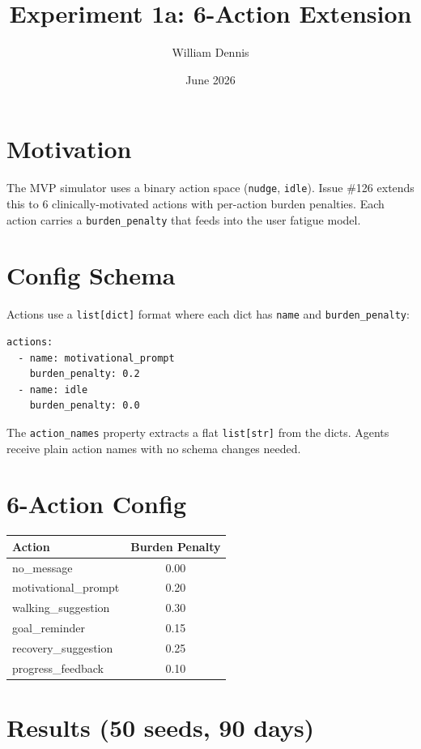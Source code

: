 \documentclass[11pt]{article}
\title{Experiment 1a: 6-Action Extension}
\author{William Dennis}
\date{June 2026}
\begin{document}
\maketitle

\section{Motivation}

The MVP simulator uses a binary action space (\texttt{nudge}, \texttt{idle}).
Issue \#126 extends this to 6 clinically-motivated actions with per-action
burden penalties. Each action carries a \texttt{burden\_penalty} that feeds
into the user fatigue model.

\section{Config Schema}

Actions use a \texttt{list[dict]} format where each dict has \texttt{name}
and \texttt{burden\_penalty}:

\begin{verbatim}
actions:
  - name: motivational_prompt
    burden_penalty: 0.2
  - name: idle
    burden_penalty: 0.0
\end{verbatim}

The \texttt{action\_names} property extracts a flat \texttt{list[str]} from
the dicts. Agents receive plain action names with no schema changes needed.

\section{6-Action Config}

\begin{center}
\begin{tabular}{lc}
\toprule
Action & Burden Penalty \\
\midrule
no\_message & 0.00 \\
motivational\_prompt & 0.20 \\
walking\_suggestion & 0.30 \\
goal\_reminder & 0.15 \\
recovery\_suggestion & 0.25 \\
progress\_feedback & 0.10 \\
\bottomrule
\end{tabular}
\end{center}

\section{Results (50 seeds, 90 days)}
\end{document}
